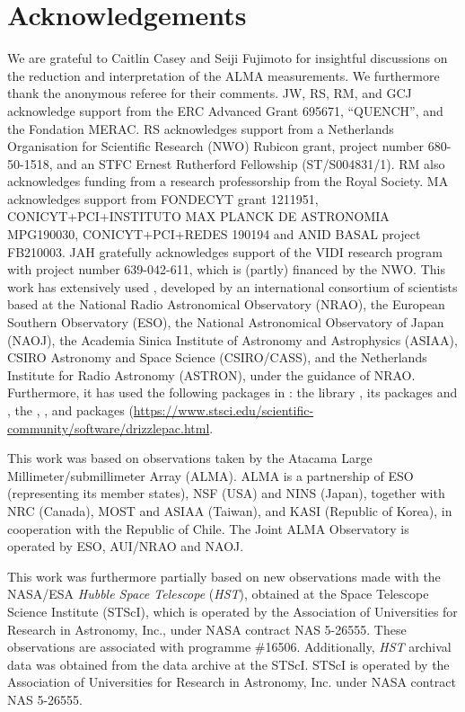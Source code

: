 \section*{Acknowledgements}

We are grateful to Caitlin Casey and Seiji Fujimoto for insightful discussions on the reduction and interpretation of the ALMA measurements. We furthermore thank the anonymous referee for their comments. JW, RS, RM, and GCJ acknowledge support from the ERC Advanced Grant 695671, ``QUENCH'', and the Fondation MERAC. RS acknowledges support from a Netherlands Organisation for Scientific Research (NWO) Rubicon grant, project number 680-50-1518, and an STFC Ernest Rutherford Fellowship (ST/S004831/1). RM also acknowledges funding from a research professorship from the Royal Society. MA acknowledges support from FONDECYT grant 1211951, CONICYT+PCI+INSTITUTO MAX PLANCK DE ASTRONOMIA MPG190030, CONICYT+PCI+REDES 190194 and ANID BASAL project FB210003. JAH gratefully acknowledges support of the VIDI research program with project number 639-042-611, which is (partly) financed by the NWO. This work has extensively used  \citep{2007ASPC..376..127M}, developed by an international consortium of scientists based at the National Radio Astronomical Observatory (NRAO), the European Southern Observatory (ESO), the National Astronomical Observatory of Japan (NAOJ), the Academia Sinica Institute of Astronomy and Astrophysics (ASIAA), CSIRO Astronomy and Space Science (CSIRO/CASS), and the Netherlands Institute for Radio Astronomy (ASTRON), under the guidance of NRAO. Furthermore, it has used the following packages in : the  library \citep{Jones2001}, its packages  \citep{2011CSE....13b..22V} and  \citep{Hunter2007}, the  \citep{2013A&A...558A..33A, 2018AJ....156..123A},  \citep{2009MNRAS.398.1601F, 2014A&A...564A.125B}, and  packages (\url{https://www.stsci.edu/scientific-community/software/drizzlepac.html}.

This work was based on observations taken by the Atacama Large Millimeter/submillimeter Array (ALMA). ALMA is a partnership of ESO (representing its member states), NSF (USA) and NINS (Japan), together with NRC (Canada), MOST and ASIAA (Taiwan), and KASI (Republic of Korea), in cooperation with the Republic of Chile. The Joint ALMA Observatory is operated by ESO, AUI/NRAO and NAOJ.

This work was furthermore partially based on new observations made with the NASA/ESA \textit{Hubble Space Telescope} (\textit{HST}), obtained at the Space Telescope Science Institute (STScI), which is operated by the Association of Universities for Research in Astronomy, Inc., under NASA contract NAS 5-26555. These observations are associated with programme \#16506. Additionally, \textit{HST} archival data was obtained from the data archive at the STScI. STScI is operated by the Association of Universities for Research in Astronomy, Inc. under NASA contract NAS 5-26555.

